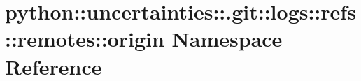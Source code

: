 \hypertarget{namespacepython_1_1uncertainties_1_1_8git_1_1logs_1_1refs_1_1remotes_1_1origin}{
\section{python::uncertainties::.git::logs::refs::remotes::origin Namespace Reference}
\label{namespacepython_1_1uncertainties_1_1_8git_1_1logs_1_1refs_1_1remotes_1_1origin}
}
